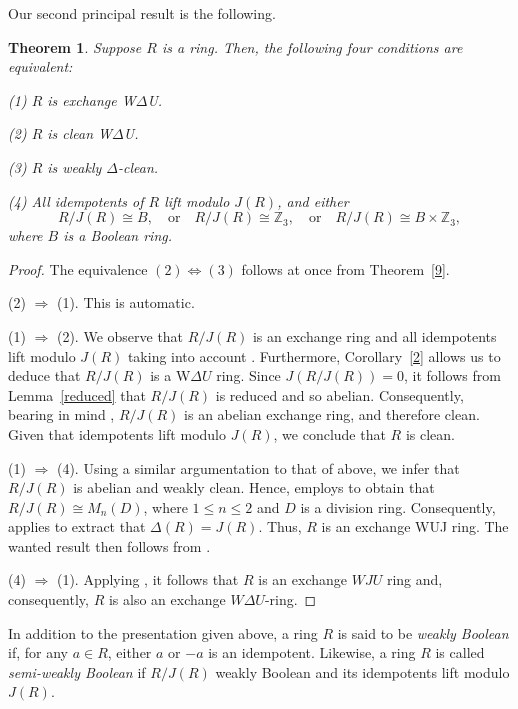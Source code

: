 \documentclass[12pt]{amsart}
\newtheorem{theorem}{Theorem}[section]
\theoremstyle{definition}
\begin{document}
Our second principal result is the following.

\begin{theorem}\label{main}
Suppose \( R \) is a ring. Then, the following four conditions are equivalent:
	
(1) \( R \) is exchange W$\Delta$U.
	
(2) \( R \) is clean W$\Delta$U.
	
(3) \( R \) is weakly $\Delta$-clean.
	
(4) All idempotents of \( R \) lift modulo \( J(R) \), and either
\[
	R / J(R) \cong B, \quad \text{or} \quad R / J(R) \cong \mathbb{Z}_3, \quad \text{or} \quad R / J(R) \cong B \times \mathbb{Z}_3,
\]
where \( B \) is a Boolean ring.
\end{theorem}

\begin{proof}
The equivalence \( (2) \Leftrightarrow (3) \) follows at once from Theorem~\ref{9}.

(2) \( \Rightarrow \) (1). This is automatic.

(1) \( \Rightarrow \) (2). We observe that \( R/J(R) \) is an exchange ring and all idempotents lift modulo \( J(R) \) taking into account \cite[Proposition 1.5]{8}. Furthermore, Corollary~\ref{2} allows us to deduce that \( R/J(R) \) is a W\( \Delta U \) ring. Since \( J(R/J(R)) = 0 \), it follows from Lemma~\ref{reduced} that \( R/J(R) \) is reduced and so abelian. Consequently, bearing in mind \cite[Proposition 1.8(2)]{8}, \( R/J(R) \) is an abelian exchange ring, and therefore clean. Given that idempotents lift modulo \( J(R) \), we conclude that \( R \) is clean.

(1) \( \Rightarrow \) (4). Using a similar argumentation to that of above, we infer that \( R/J(R) \) is abelian and weakly clean. Hence, \cite[Proposition 14]{9} employs to obtain that \( R/J(R) \cong M_n(D) \), where \( 1 \leq n \leq 2 \) and \( D \) is a division ring. Consequently, \cite[Theorem 11]{2} applies to extract that \( \Delta(R) = J(R) \). Thus, \( R \) is an exchange WUJ ring. The wanted result then follows from \cite[Theorem 2.2]{wuj}.

(4) \( \Rightarrow \) (1). Applying \cite[Theorem~2.2]{wuj}, it follows that $R$ is an exchange $WJU$ ring and, consequently, $R$ is also an exchange $W\Delta U$-ring.
\end{proof}

In addition to the presentation given above, a ring $R$ is said to be {\it weakly Boolean} if, for any $a\in R$, either $a$ or $-a$ is an idempotent. Likewise, a ring $R$ is called {\it semi-weakly Boolean} if $R/J(R)$ weakly Boolean and its idempotents lift modulo $J(R)$.
\end{document}
